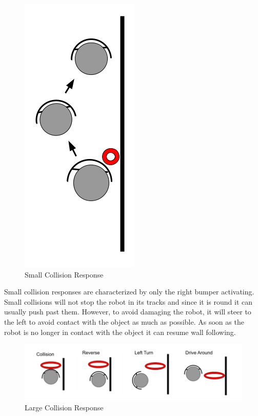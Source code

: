 \documentclass[12pt]{report}
\begin{document}
\begin{figure}[H]
    \centering
    \includegraphics[scale=0.6]{images/Collision Response.png}
    \caption{Small Collision Response}
    \label{Small Collision}
\end{figure}

Small collision responses are characterized by only the right bumper activating. Small collisions will not stop the robot in its tracks and since it is round it can usually push past them. However, to avoid damaging the robot, it will steer to the left to avoid contact with the object as much as possible. As soon as the robot is no longer in contact with the object it can resume wall following. 

\begin{figure}[H]
    \centering
    \includegraphics[scale=0.6]{images/LargeCollision.png}
    \caption{Large Collision Response}
    \label{Large Collision}
\end{figure}
\end{document}
